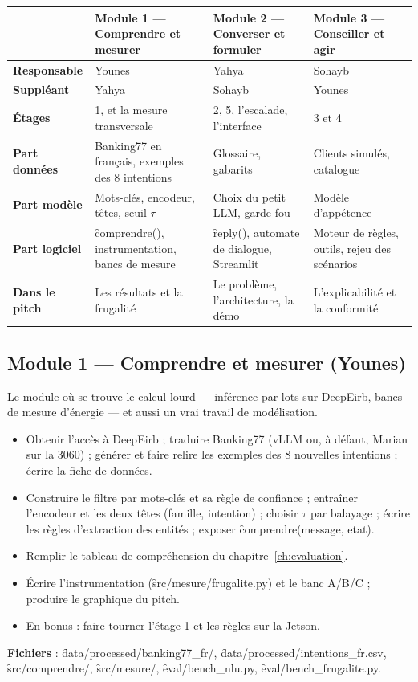 \begin{center}\small
\begin{tabularx}{\textwidth}{@{}L{3.3cm} Y Y Y@{}}
\toprule
& \textbf{Module 1 --- Comprendre et mesurer} & \textbf{Module 2 --- Converser et formuler} &
  \textbf{Module 3 --- Conseiller et agir} \\
\midrule
\textbf{Responsable} & Younes & Yahya & Sohayb \\
\textbf{Suppléant} & Yahya & Sohayb & Younes \\
\textbf{Étages} & 1, et la mesure transversale & 2, 5, l'escalade, l'interface & 3 et 4 \\
\textbf{Part données} & Banking77 en français, exemples des 8 intentions & Glossaire, gabarits &
  Clients simulés, catalogue \\
\textbf{Part modèle} & Mots-clés, encodeur, têtes, seuil $\tau$ & Choix du petit LLM, garde-fou & Modèle
  d'appétence \\
\textbf{Part logiciel} & \f{comprendre()}, instrumentation, bancs de mesure & \f{reply()},
  automate de dialogue, Streamlit & Moteur de règles, outils, rejeu des scénarios \\
\textbf{Dans le pitch} & Les résultats et la frugalité & Le problème, l'architecture, la démo &
  L'explicabilité et la conformité \\
\bottomrule
\end{tabularx}
\end{center}

\subsection{Module 1 --- Comprendre et mesurer (Younes)}

Le module où se trouve le calcul lourd --- inférence par lots sur DeepEirb, bancs de mesure
d'énergie --- et aussi un vrai travail de modélisation.

\begin{itemize}
  \item Obtenir l'accès à DeepEirb ; traduire Banking77 (vLLM ou, à défaut, Marian sur la 3060) ;
        générer et faire relire les exemples des 8 nouvelles intentions ; écrire la fiche de
        données.
  \item Construire le filtre par mots-clés et sa règle de confiance ; entraîner l'encodeur et les
        deux têtes (famille, intention) ; choisir $\tau$ par balayage ;
        écrire les règles d'extraction des entités ; exposer \f{comprendre(message, etat)}.
  \item Remplir le tableau de compréhension du chapitre~\ref{ch:evaluation}.
  \item Écrire l'instrumentation (\f{src/mesure/frugalite.py}) et le banc A/B/C ; produire le
        graphique du pitch.
  \item En bonus : faire tourner l'étage 1 et les règles sur la Jetson.
\end{itemize}
\textbf{Fichiers} : \f{data/processed/banking77\_fr/}, \f{data/processed/intentions\_fr.csv},
\f{src/comprendre/}, \f{src/mesure/}, \f{eval/bench\_nlu.py}, \f{eval/bench\_frugalite.py}.

